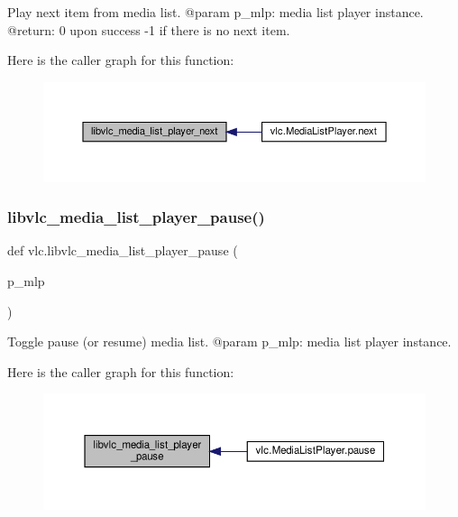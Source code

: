 \begin{DoxyVerb}Play next item from media list.
@param p_mlp: media list player instance.
@return: 0 upon success -1 if there is no next item.
\end{DoxyVerb}
 Here is the caller graph for this function\+:
\nopagebreak
\begin{figure}[H]
\begin{center}
\leavevmode
\includegraphics[width=350pt]{namespacevlc_ad7b227a78e34e99300dfa0d794b906cb_icgraph}
\end{center}
\end{figure}
\mbox{\label{namespacevlc_a789787fb851dce24255c0e24199818de}} 
\subsubsection{\texorpdfstring{libvlc\+\_\+media\+\_\+list\+\_\+player\+\_\+pause()}{libvlc\_media\_list\_player\_pause()}}
{\footnotesize\ttfamily def vlc.\+libvlc\+\_\+media\+\_\+list\+\_\+player\+\_\+pause (\begin{DoxyParamCaption}\item[{}]{p\+\_\+mlp }\end{DoxyParamCaption})}

\begin{DoxyVerb}Toggle pause (or resume) media list.
@param p_mlp: media list player instance.
\end{DoxyVerb}
 Here is the caller graph for this function\+:
\nopagebreak
\begin{figure}[H]
\begin{center}
\leavevmode
\includegraphics[width=350pt]{namespacevlc_a789787fb851dce24255c0e24199818de_icgraph}
\end{center}
\end{figure}
\mbox{\label{namespacevlc_a613ec3b14b03b7c91c89783e633bc031}} 
